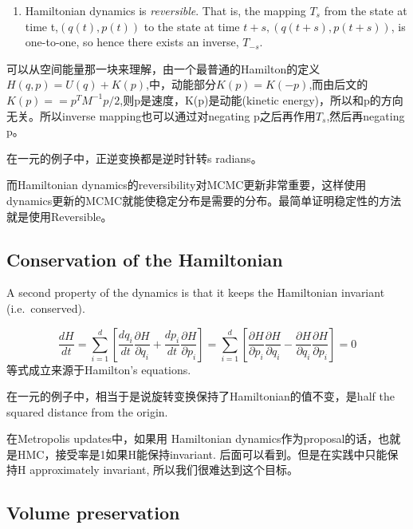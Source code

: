 \documentclass[
]{book}
\providecommand{\tightlist}{%
  \setlength{\itemsep}{0pt}\setlength{\parskip}{0pt}}
\theoremstyle{definition}
\theoremstyle{definition}
\theoremstyle{definition}
\theoremstyle{remark}
\begin{document}
\begin{enumerate}
\def\labelenumi{\arabic{enumi}.}
\tightlist
\item
  Hamiltonian dynamics is \emph{reversible}. That is, the mapping \(T_{s}\) from the state at time t,\((q(t),p(t))\) to the state at time \(t+s,(q(t+s),p(t+s))\), is one-to-one, so hence there exists an inverse, \(T_{-s}\).
\end{enumerate}

可以从空间能量那一块来理解，由一个最普通的Hamilton的定义\(H(q, p)=U(q)+K(p)\),中，动能部分\(K(p)=K(-p)\),而由后文的\(K(p)==p^{T} M^{-1} p / 2\),则p是速度，K(p)是动能(kinetic energy)，所以和p的方向无关。所以inverse mapping也可以通过对negating p之后再作用\(T_s\),然后再negating p。

在一元的例子中，正逆变换都是逆时针转s radians。

而Hamiltonian dynamics的reversibility对MCMC更新非常重要，这样使用dynamics更新的MCMC就能使稳定分布是需要的分布。最简单证明稳定性的方法就是使用Reversible。

\hypertarget{conservation-of-the-hamiltonian}{%
\subsection{Conservation of the Hamiltonian}\label{conservation-of-the-hamiltonian}}

A second property of the dynamics is that it keeps the Hamiltonian invariant (i.e.~conserved).

\[
\frac{d H}{d t}=\sum_{i=1}^{d}\left[\frac{d q_{i}}{d t} \frac{\partial H}{\partial q_{i}}+\frac{d p_{i}}{d t} \frac{\partial H}{\partial p_{i}}\right]=\sum_{i=1}^{d}\left[\frac{\partial H}{\partial p_{i}} \frac{\partial H}{\partial q_{i}}-\frac{\partial H}{\partial q_{i}} \frac{\partial H}{\partial p_{i}}\right]=0
\]
等式成立来源于Hamilton's equations.

在一元的例子中，相当于是说旋转变换保持了Hamiltonian的值不变，是half the squared distance from the origin.

在Metropolis updates中，如果用 Hamiltonian dynamics作为proposal的话，也就是HMC，接受率是1如果H能保持invariant. 后面可以看到。但是在实践中只能保持H approximately invariant, 所以我们很难达到这个目标。

\hypertarget{volume-preservation}{%
\subsection{Volume preservation}\label{volume-preservation}}
\end{document}
